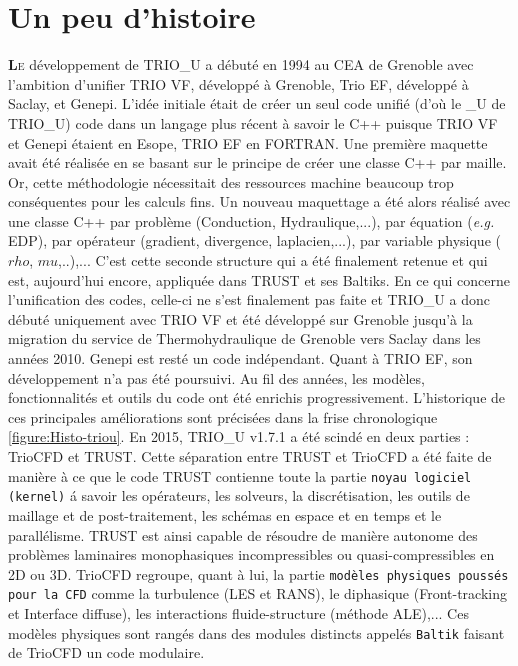 \chapter{Un peu d'histoire}

\lettrine[lines=2,slope=0pt,nindent=4pt]{\textbf{L}}{e} d\'eveloppement de TRIO\_U a d\'ebut\'e en 1994 au CEA de Grenoble avec l'ambition d'unifier TRIO VF, d\'evelopp\'e \`a Grenoble, Trio EF, d\'evelopp\'e \`a Saclay, et Genepi.\smallskip\newline
L'id\'ee initiale \'etait de cr\'eer un seul code unifi\'e (d'o\`u le \_U de TRIO\_U) code dans un langage plus r\'ecent \`a savoir le C++ puisque TRIO VF et Genepi \'etaient en Esope, TRIO EF en FORTRAN. Une premi\`ere maquette avait \'et\'e réalisée en se basant
sur le principe de cr\'eer une classe C++ par maille. Or, cette m\'ethodologie nécessitait des ressources machine beaucoup trop cons\'equentes pour les calculs fins. Un nouveau maquettage a \'et\'e alors réalisé avec une classe C++ par probl\`eme (Conduction, Hydraulique,...), par \'equation (\textit{e.g.} EDP), par op\'erateur (gradient, divergence, laplacien,...), par variable physique ($rho$, $mu$,..),... C'est cette seconde structure qui a \'et\'e finalement retenue et qui est, aujourd'hui encore, appliqu\'ee dans TRUST et ses Baltiks.\smallskip\newline
En ce qui concerne l'unification des codes, celle-ci ne s'est finalement pas faite et TRIO\_U a donc d\'ebut\'e uniquement avec TRIO VF et été d\'evelopp\'e sur Grenoble jusqu'\`a la migration du service de Thermohydraulique de Grenoble vers Saclay dans les ann\'ees 2010. Genepi est rest\'e un code ind\'ependant. Quant \`a TRIO EF, son d\'eveloppement n'a pas \'et\'e poursuivi.\smallskip\newline
Au fil des ann\'ees, les mod\`eles, fonctionnalit\'es et outils du code ont \'et\'e enrichis progressivement. L'historique de ces principales am\'eliorations sont pr\'ecis\'ees dans la frise chronologique \ref{figure:Histo-triou}.\smallskip\newline
En 2015, TRIO\_U v1.7.1 a \'et\'e scind\'e en deux parties : TrioCFD et TRUST. 
Cette s\'eparation entre TRUST et TrioCFD a \'et\'e faite de mani\`ere à ce que le code TRUST contienne toute la partie \texttt{noyau logiciel (kernel)} \'a savoir les op\'erateurs, les solveurs, la discr\'etisation, les outils de maillage et de post-traitement, les sch\'emas en espace et en temps et le parall\'elisme. TRUST est ainsi capable de r\'esoudre de mani\`ere autonome des probl\`emes laminaires monophasiques incompressibles ou quasi-compressibles en 2D ou 3D. TrioCFD regroupe, quant \`a lui, la partie \texttt{mod\`eles physiques pouss\'es pour la CFD} comme la turbulence
(LES et RANS), le diphasique (Front-tracking et Interface diffuse), les interactions fluide-structure (m\'ethode ALE),... Ces mod\`eles physiques sont rang\'es dans des modules distincts appel\'es \texttt{Baltik} faisant de TrioCFD un code modulaire.

